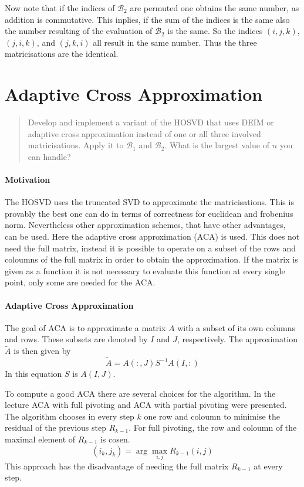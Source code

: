 \documentclass[%
a4paper,
parskip=half,
DIV=calc,
]
{scrartcl}
\begin{document}
Now note that if the indices of $\mathcal{B}_2$ are permuted one
obtains the same number, as addition is commutative.  This inplies, if
the sum of the indices is the same also the number resulting of the
evaluation of $\mathcal{B}_2$ is the same.  So the indices
$(i, j, k)$, $(j, i, k)$, and $(j, k, i)$ all result in the same
number.  Thus the three matricisations are the identical.

\section{Adaptive Cross Approximation}
\label{sec:aca}
\begin{quotation}
  \noindent
  Develop and implement a variant of the HOSVD that uses DEIM or
  adaptive cross approximation instead of one or all three involved
  matricisations. Apply it to $\mathcal{B}_1$ and
  $\mathcal{B}_2$. What is the largest value of $n$ you can handle?
\end{quotation}

\paragraph{Motivation}
The HOSVD uses the truncated SVD to approximate the
matricisations. This is provably the best one can do in terms of
correctness for euclidean and frobenius norm.  Nevertheless other
approximation schemes, that have other advantages, can be used.  Here
the adaptive cross approximation (ACA) is used.  This does not need
the full matrix, instead it is possible to operate on a subset of the
rows and coloumns of the full matrix in order to obtain the
approximation.  If the matrix is given as a function it is not
necessary to evaluate this function at every single point, only some
are needed for the ACA.

\paragraph{Adaptive Cross Approximation}
The goal of ACA is to approximate a matrix $A$ with a subset of its
own columns and rows. These subsets are denoted by $I$ and $J$,
respectively.  The approximation $\tilde{A}$ is then given by
\begin{equation*}
  \tilde{A} = A(:,J) S^{-1} A(I,:)
\end{equation*}
In this equation $S$ is $A(I,J)$.

To compute a good ACA there are several choices for the algorithm.  In
the lecture ACA with full pivoting and ACA with partial pivoting were
presented.  The algorithm chooses in every step $k$ one row and
coloumn to minimise the residual of the previous step $R_{k-1}$.  For
full pivoting, the row and coloumn of the maximal element of $R_{k-1}$
is cosen.
\begin{equation*}
  (i_k, j_k) = \arg\max_{i,j} R_{k-1}(i, j)
\end{equation*}
This approach has the disadvantage of needing the full matrix
$R_{k-1}$ at every step.
\end{document}
